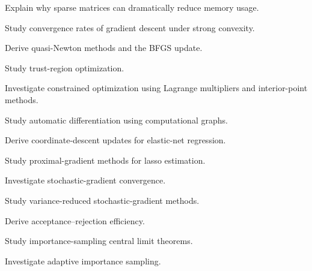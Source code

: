 \begin{exercise}[3]
Explain why sparse matrices can dramatically reduce memory usage.
\end{exercise}

\begin{exercise}[4]
Study convergence rates of gradient descent under strong convexity.
\end{exercise}

\begin{exercise}[4]
Derive quasi-Newton methods and the BFGS update.
\end{exercise}

\begin{exercise}[4]
Study trust-region optimization.
\end{exercise}

\begin{exercise}[4]
Investigate constrained optimization using Lagrange multipliers and
interior-point methods.
\end{exercise}

\begin{exercise}[4]
Study automatic differentiation using computational graphs.
\end{exercise}

\begin{exercise}[4]
Derive coordinate-descent updates for elastic-net regression.
\end{exercise}

\begin{exercise}[4]
Study proximal-gradient methods for lasso estimation.
\end{exercise}

\begin{exercise}[4]
Investigate stochastic-gradient convergence.
\end{exercise}

\begin{exercise}[4]
Study variance-reduced stochastic-gradient methods.
\end{exercise}

\begin{exercise}[4]
Derive acceptance--rejection efficiency.
\end{exercise}

\begin{exercise}[4]
Study importance-sampling central limit theorems.
\end{exercise}

\begin{exercise}[4]
Investigate adaptive importance sampling.
\end{exercise}

